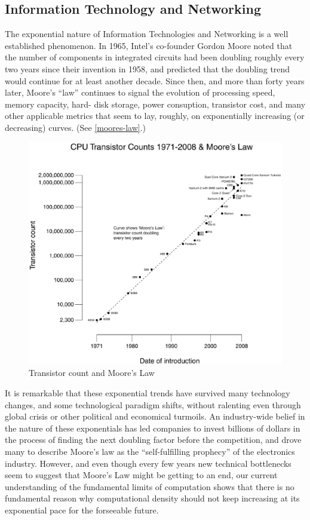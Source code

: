 \documentclass[letter,11pt]{article}
\begin{document}
\subsection{Information Technology and Networking}

The exponential nature of Information Technologies and Networking is a well
established phenomenon. In 1965, Intel's co-founder Gordon Moore noted that the
number of components in integrated circuits had been doubling roughly every two
years since their invention in 1958, and predicted that the doubling trend
would continue for at least another decade. Since then, and more than forty
years later, Moore's ``law'' continues to signal the evolution of processing
speed, memory capacity, hard- disk storage, power consuption, transistor cost,
and many other applicable metrics that seem to lay, roughly, on exponentially
increasing (or decreasing) curves. (See \autoref{moores-law}.)

\begin{figure}
\includegraphics[width=\textwidth]{Transistor_Count_and_Moore's_Law_-_2008}
\caption{Transistor count and Moore's Law}
\label{moores-law}
\end{figure}

It is remarkable that these exponential trends have survived many technology
changes, and some technological paradigm shifts, without ralenting even through
global crisis or other political and economical turmoils. An industry-wide
belief in the nature of these exponentials has led companies to invest billions
of dollars in the process of finding the next doubling factor before the
competition, and drove many to describe Moore's law as  the ``self-fulfilling
prophecy'' of the electronics industry. However, and even though every few
years new technical bottlenecks seem to suggest that Moore's Law might be
getting to an end, our current understanding of the fundamental limits of
computation shows that there is no fundamental reason why computational density
should not keep increasing at its exponential pace for the forseeable future.
\end{document}
